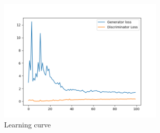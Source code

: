 \documentclass[a4paper]{article}
\theoremstyle{definition}
\newenvironment{soln}{
	\leavevmode\color{blue}\ignorespaces
}{}
\begin{document}
\begin{enumerate} [label=(\alph*)]
		\begin{soln}  
  
                \begin{figure}[H]
    			\centering
    			\includegraphics[width=0.7\textwidth]{hw6/1.c/1_c_loss.png}
    			\caption{Learning curve}
    			\label{fig:gan_q1_loss}
    		\end{figure}
    		

\end{soln}
\end{enumerate}
\end{document}
